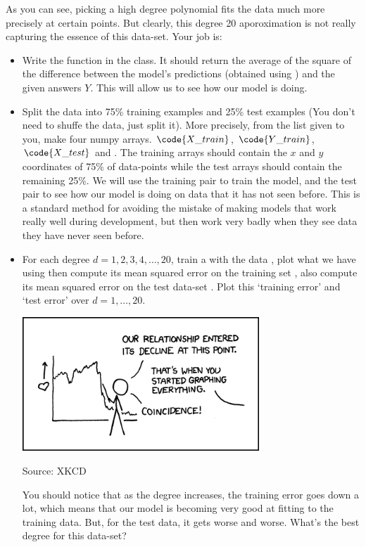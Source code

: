 \documentclass[letterpaper,11pt]{amsart}
\theoremstyle{plain}
\theoremstyle{definition}
\begin{document}
As you can see, picking a high degree polynomial fits the data much more precisely at certain points. But clearly, this degree 20 aporoximation is not really capturing the essence of this data-set. Your job is:
\begin{itemize}
  \item Write the  function in the class. It should return the average of the square of the difference between the model's predictions (obtained using ) and the given answers $Y$. This will allow us to see how our model is doing.

  \item Split the data into 75\% training examples and 25\% test examples (You don't need to shuffe the data, just split it). More precisely, from the list  given to you, make four numpy arrays. $\code{X\_train}$, $\code{Y\_train}$, $\code{X\_test}$ and . The training arrays should contain the $x$ and $y$ coordinates of 75\% of data-points while the test arrays should contain the remaining 25\%. We will use the training pair to train the model, and the test pair to see how our model is doing on data that it has not seen before. This is a standard method for avoiding the mistake of making models that work really well during development, but then work very badly when they see data they have never seen before.
    
  \item For each degree $d = 1,2,3,4,\dots,20$, train a  with the data , plot what we have using  then compute its mean squared error on the training set , also compute its mean squared error on the test data-set . Plot this `training error' and `test error' over $d=1,\dots,20$.  

\vspace{0.3in}
\begin{center}
\noindent\includegraphics[width=3.5in]{decline.png}

{\tiny Source: XKCD}
\end{center}

You should notice that as the degree increases, the training error goes down a lot, which means that our model is becoming very good at fitting to the training data. But, for the test data, it gets worse and worse. What's the best degree for this data-set?  

\end{itemize}
\end{document}
